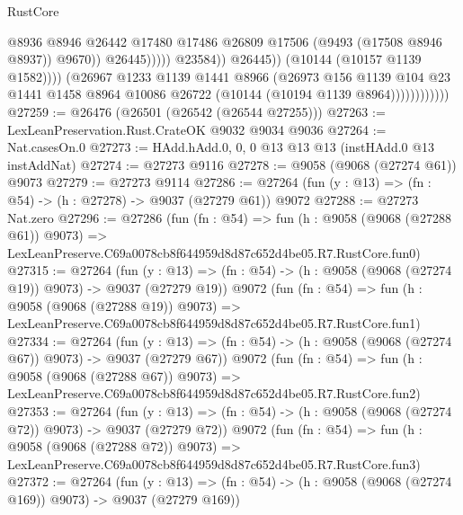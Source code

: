 \begin{lexlean}{RustCore}
\begin{coremodule}
                                              @8936
                                              @8946
                                              @26442
                                              @17480
                                              @17486
                                              @26809
                                              @17506
                                              (@9493 (@17508 @8946 @8937))
                                              @9670))
                                          @26445)))))
                                @23584))
                            @26445))
                        (@10144 (@10157 @1139 @1582))))
                    (@26967
                      @1233
                      @1139
                      @1441
                      @8966
                      (@26973
                        @156
                        @1139
                        @104
                        @23
                        @1441
                        @1458
                        @8964
                        @10086
                        @26722
                        (@10144 (@10194 @1139 @8964))))))))))))
@27259 := @26476 (@26501 (@26542 (@26544 @27255)))
@27263 := LexLeanPreservation.Rust.CrateOK @9032 @9034 @9036
@27264 := Nat.casesOn.{0}
@27273 := HAdd.hAdd.{0, 0, 0} @13 @13 @13 (instHAdd.{0} @13 instAddNat)
@27274 := @27273 @9116
@27278 := @9058 (@9068 (@27274 @61)) @9073
@27279 := @27273 @9114
@27286 := @27264 (fun (y : @13) => (fn : @54) -> (h : @27278) -> @9037 (@27279 @61)) @9072
@27288 := @27273 Nat.zero
@27296 := @27286
    (fun (fn : @54) =>
    fun (h : @9058 (@9068 (@27288 @61)) @9073) =>
    LexLeanPreserve.C69a0078cb8f644959d8d87c652d4be05.R7.RustCore.fun0)
@27315 := @27264
    (fun (y : @13) => (fn : @54) -> (h : @9058 (@9068 (@27274 @19)) @9073) -> @9037 (@27279 @19))
    @9072
    (fun (fn : @54) =>
    fun (h : @9058 (@9068 (@27288 @19)) @9073) =>
    LexLeanPreserve.C69a0078cb8f644959d8d87c652d4be05.R7.RustCore.fun1)
@27334 := @27264
    (fun (y : @13) => (fn : @54) -> (h : @9058 (@9068 (@27274 @67)) @9073) -> @9037 (@27279 @67))
    @9072
    (fun (fn : @54) =>
    fun (h : @9058 (@9068 (@27288 @67)) @9073) =>
    LexLeanPreserve.C69a0078cb8f644959d8d87c652d4be05.R7.RustCore.fun2)
@27353 := @27264
    (fun (y : @13) => (fn : @54) -> (h : @9058 (@9068 (@27274 @72)) @9073) -> @9037 (@27279 @72))
    @9072
    (fun (fn : @54) =>
    fun (h : @9058 (@9068 (@27288 @72)) @9073) =>
    LexLeanPreserve.C69a0078cb8f644959d8d87c652d4be05.R7.RustCore.fun3)
@27372 := @27264
    (fun (y : @13) => (fn : @54) -> (h : @9058 (@9068 (@27274 @169)) @9073) -> @9037 (@27279 @169))

\end{coremodule}
\end{lexlean}
